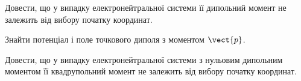 \begin{problem}
Довести, що у випадку електронейтральної системи її дипольний момент не залежить від вибору початку координат.
\end{problem}

\begin{problem}
Знайти потенціал і поле точкового диполя з моментом $\vect{p}$.
\end{problem}

\begin{problem}
Довести, що у випадку електронейтральної системи з нульовим дипольним моментом її квадрупольний момент
не залежить від вибору початку координат.
\end{problem}

